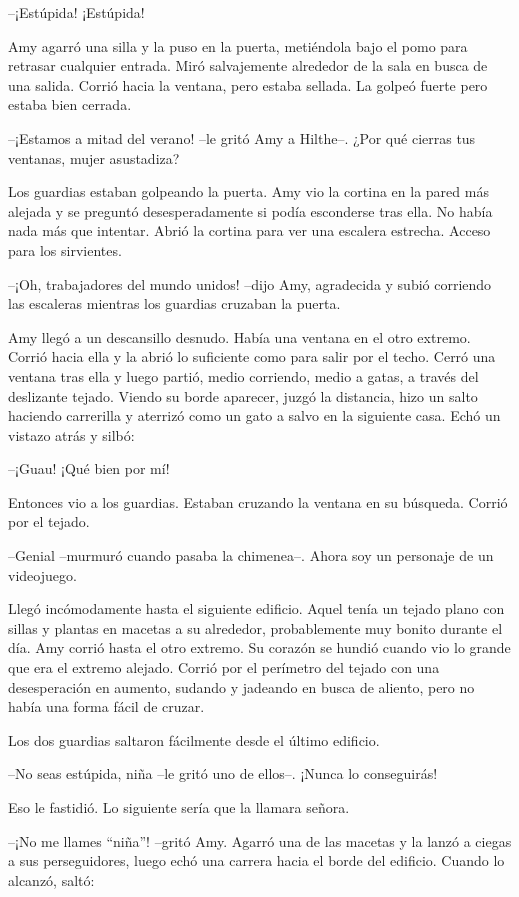 {--¡Estúpida! ¡Estúpida!}

{Amy agarró una silla y la puso en la puerta, metiéndola bajo el pomo
	para retrasar cualquier entrada. Miró salvajemente alrededor de la sala
	en busca de una salida. Corrió hacia la ventana, pero estaba sellada. La
golpeó fuerte pero estaba bien cerrada.}

{--¡Estamos a mitad del verano! --le gritó Amy a Hilthe--. ¿Por qué
cierras tus ventanas, mujer asustadiza?}

{Los guardias estaban golpeando la puerta. Amy vio la cortina en la
	pared más alejada y se preguntó desesperadamente si podía esconderse
	tras ella. No había nada más que intentar. Abrió la cortina para ver una
escalera estrecha. Acceso para los sirvientes.}

{--¡Oh, trabajadores del mundo unidos! --dijo Amy, agradecida y subió
corriendo las escaleras mientras los guardias cruzaban la puerta.}

{Amy llegó a un descansillo desnudo. Había una ventana en el otro
	extremo. Corrió hacia ella y la abrió lo suficiente como para salir por
	el techo. Cerró una ventana tras ella y luego partió, medio corriendo,
	medio a gatas, a través del deslizante tejado. Viendo su borde aparecer,
	juzgó la distancia, hizo un salto haciendo carrerilla y aterrizó como un
gato a salvo en la siguiente casa. Echó un vistazo atrás y silbó:}

{--¡Guau! ¡Qué bien por mí!}

{Entonces vio a los guardias. Estaban cruzando la ventana en su
búsqueda. Corrió por el tejado.}

{--Genial --murmuró cuando pasaba la chimenea--. Ahora soy un
personaje de un videojuego.}

{Llegó incómodamente hasta el siguiente edificio. Aquel tenía un tejado
	plano con sillas y plantas en macetas a su alrededor, probablemente muy
	bonito durante el día. Amy corrió hasta el otro extremo. Su corazón se
	hundió cuando vio lo grande que era el extremo alejado. Corrió por el
	perímetro del tejado con una desesperación en aumento, sudando y
jadeando en busca de aliento, pero no había una forma fácil de cruzar.}

{Los dos guardias saltaron fácilmente desde el último edificio.}

{--No seas estúpida, niña --le gritó uno de ellos--. ¡Nunca lo
conseguirás!}

{Eso le fastidió. Lo siguiente sería que la llamara señora.}

{--¡No me llames ``niña''! --gritó Amy. Agarró una de las macetas y la
	lanzó a ciegas a sus perseguidores, luego echó una carrera hacia el
borde del edificio. Cuando lo alcanzó, saltó:}

